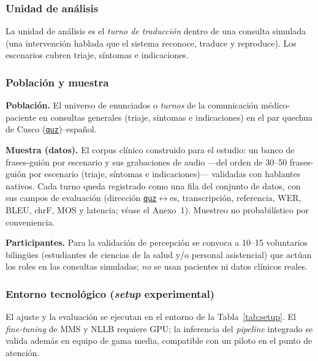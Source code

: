 \documentclass[12pt,a4paper]{article}
\newcommand{\nuevo}[1]{#1}
\newenvironment{bloqueNuevo}{\par}{\par}
\newenvironment{bloqueObsDos}{\par\color{verdeOK}}{\par}
\DeclareRobustCommand{\sig}[1]{\hyperlink{sig:#1}{\texttt{#1}}}
\begin{document}
\subsubsection{Unidad de an{\'a}lisis}
La unidad de an{\'a}lisis es el \emph{turno de traducci{\'o}n} dentro de una consulta simulada
(una intervenci{\'o}n hablada que el sistema reconoce, traduce y reproduce). Los escenarios cubren
triaje, s{\'i}ntomas e indicaciones.

\subsubsection{Poblaci{\'o}n y muestra}
\begin{bloqueObsDos}
\noindent\textbf{Poblaci{\'o}n.} El universo de enunciados o \emph{turnos} de la comunicaci{\'o}n
m{\'e}dico-paciente en consultas generales (triaje, s{\'i}ntomas e indicaciones) en el par quechua de
Cusco (\sig{quz})--espa{\~n}ol.

\noindent\textbf{Muestra (datos).} El corpus cl{\'i}nico construido para el estudio: un banco de
frases-gui{\'o}n por escenario y sus grabaciones de audio ---del orden de 30--50 frases-gui{\'o}n por
escenario (triaje, s{\'i}ntomas e indicaciones)--- validadas con hablantes nativos. Cada turno queda
registrado como una fila del conjunto de datos, con sus campos de evaluaci{\'o}n (direcci{\'o}n
\sig{quz}$\leftrightarrow$es, transcripci{\'o}n, referencia, WER, BLEU, chrF, MOS y latencia; v{\'e}ase
el Anexo~1). Muestreo no probabil{\'i}stico por conveniencia.

\noindent\textbf{Participantes.} Para la validaci{\'o}n de percepci{\'o}n se convoca a 10--15
voluntarios biling{\"u}es (estudiantes de ciencias de la salud y/o personal asistencial) que act{\'u}an
los roles en las consultas simuladas; \emph{no} se usan pacientes ni datos cl{\'i}nicos reales.
\end{bloqueObsDos}

\subsubsection{\nuevo{Entorno tecnol{\'o}gico (\emph{setup} experimental)}}
\begin{bloqueNuevo}
El ajuste y la evaluaci{\'o}n se ejecutan en el entorno de la Tabla~\ref{tab:setup}. El
\emph{fine-tuning} de MMS y NLLB requiere GPU; la inferencia del \emph{pipeline} integrado se valida
adem{\'a}s en equipo de gama media, compatible con un piloto en el punto de atenci{\'o}n.
\end{bloqueNuevo}
\end{document}
